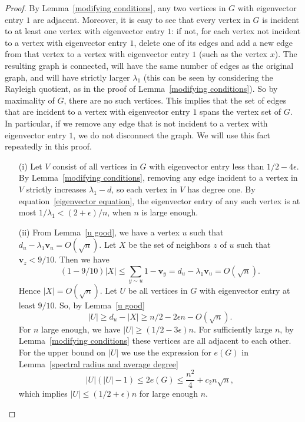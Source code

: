 \begin{proof}
  By Lemma~\ref{modifying conditions}, any two vertices in $G$ with eigenvector entry $1$ are adjacent.  Moreover, it is easy to see that
  every vertex in $G$ is incident to at least one vertex with eigenvector entry $1$:  if not, for each vertex not incident to a vertex
  with eigenvector entry $1$, delete one of its edges and add a new edge from that vertex to a vertex with eigenvector entry $1$ (such as
  the vertex $x$).  The resulting graph is connected, will have the same number of edges as the original graph, and will have strictly larger $\lambda_1$
  (this can be seen by considering the Rayleigh quotient, as in the proof of Lemma~\ref{modifying conditions}).
  So by maximality of $G$, there are no such vertices.  This implies that the set of edges that are incident
  to a vertex with eigenvector entry $1$ spans the vertex set of $G$. 
  In particular, if we remove any edge that is not incident to a vertex with eigenvector entry $1$, we do not disconnect the graph.  We will use this fact repeatedly in this proof.

 
  
\begin{itemize}
\item[(i)] Let $V$ consist of all vertices in $G$ with eigenvector entry 
less than $1/2 - 4 \epsilon$.  By Lemma~\ref{modifying conditions}, removing 
any edge incident to a vertex in $V$ strictly increases $\lambda_1 - d$, so each vertex in $V$ has degree one.  By equation~\eqref{eigenvector equation},
the eigenvector entry of any such vertex is at most $1/\lambda_1 < (2+\epsilon) / n $, when $n$ is large enough.
\item[(ii)] From Lemma~\ref{u good}, we have a vertex $u$ such that $d_u - \lambda_1 \mathbf{v}_u = O(\sqrt{n})$.  Let $X$ be the set of neighbors $z$ of $u$ such that $\mathbf{v}_z < 9/10$.  Then we have
 \[ (1 - 9/10)|X| \leq \sum_{y \sim u} 1 - \mathbf{v}_y = d_u - \lambda_1 \mathbf{v}_u = O(\sqrt{n}). \]
Hence $|X| = O(\sqrt{n})$.  Let $U$ be all vertices in $G$ with eigenvector entry at least $9/10$.  So, by Lemma~\ref{u good}
 \[ |U| \geq d_u - |X| \geq n/2 - 2 \epsilon n - O(\sqrt{n}) . \]
For $n$ large enough, we have $|U| \geq (1/2 - 3\epsilon) n$. For sufficiently large $n$, by Lemma~\ref{modifying conditions} these vertices are all adjacent to each other.  For the upper bound on $|U|$ we use the expression for $e(G)$ in Lemma~\ref{spectral radius and average degree}
\[ |U| (|U| - 1) \leq 2e(G) \leq  \frac{n^2}{4} + c_2n\sqrt{n}, \]
which implies $|U| \leq (1/2+\epsilon) n$ for large enough $n$.


\end{itemize}
\end{proof}
